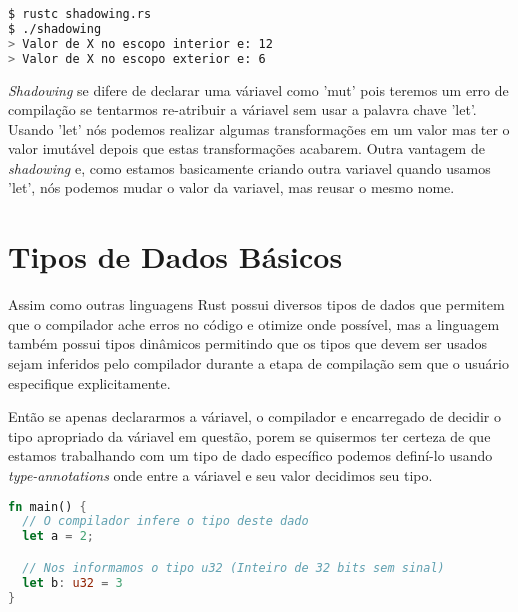 \begin{lstlisting}[language=bash]
$ rustc shadowing.rs
$ ./shadowing
> Valor de X no escopo interior e: 12
> Valor de X no escopo exterior e: 6
\end{lstlisting}

\textit{Shadowing} se difere de declarar uma váriavel como 'mut' pois teremos um erro de compilação se tentarmos re-atribuir a váriavel sem usar a palavra chave 'let'. Usando 'let' nós podemos realizar algumas transformações em um valor mas ter o valor imutável depois que estas transformações acabarem. Outra vantagem de \textit{shadowing} e, como estamos basicamente criando outra variavel quando usamos 'let', nós podemos mudar o valor da variavel, mas reusar o mesmo nome.

\section{Tipos de Dados B\'{a}sicos}

Assim como outras linguagens Rust possui diversos tipos de dados que permitem que o compilador ache erros no código e otimize onde possível, mas a linguagem também possui tipos dinâmicos permitindo que os tipos que devem ser usados sejam inferidos pelo compilador durante a etapa de compilação sem que o usuário especifique explicitamente.
\par
Então se apenas declararmos a váriavel, o compilador e encarregado de decidir o tipo apropriado da váriavel em questão, porem se quisermos ter certeza de que estamos trabalhando com um tipo de dado específico podemos definí-lo usando \textit{type-annotations} onde entre a váriavel e seu valor decidimos seu tipo.
\begin{lstlisting}[language=rust]
fn main() {
  // O compilador infere o tipo deste dado 
  let a = 2; 

  // Nos informamos o tipo u32 (Inteiro de 32 bits sem sinal)
  let b: u32 = 3 
}
\end{lstlisting}
